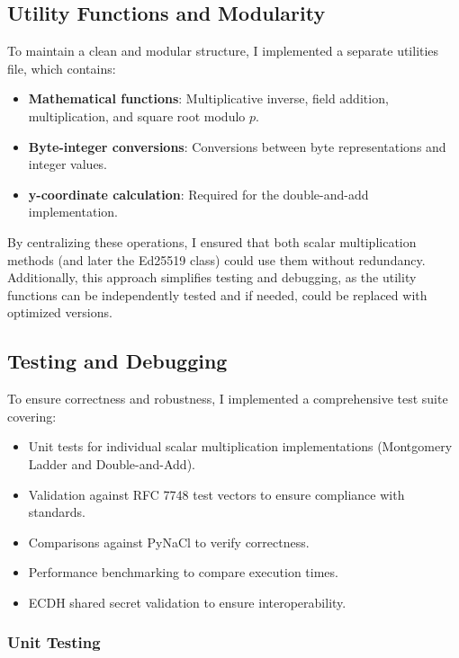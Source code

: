 \documentclass[twoside,a4paper,12pt]{article}
\begin{document}
\subsection{Utility Functions and Modularity}
\label{subsec:x25519_utils}

To maintain a clean and modular structure, I implemented a separate utilities file, which contains:
\begin{itemize}
    \item \textbf{Mathematical functions}: Multiplicative inverse, field addition, multiplication, and square root modulo \( p \).
    \item \textbf{Byte-integer conversions}: Conversions between byte representations and integer values.
    \item \textbf{y-coordinate calculation}: Required for the double-and-add implementation.
\end{itemize}
By centralizing these operations, I ensured that both scalar multiplication methods (and later the Ed25519 class) could use them without redundancy. Additionally, this approach simplifies testing and debugging, as the utility functions can be independently tested and if needed, could be replaced with optimized versions.

\subsection{Testing and Debugging}
\label{subsec:x25519_testing}

To ensure correctness and robustness, I implemented a comprehensive test suite covering:
\begin{itemize}
    \item Unit tests for individual scalar multiplication implementations (Montgomery Ladder and Double-and-Add).
    \item {Validation against RFC 7748 test vectors} to ensure compliance with standards.
    \item {Comparisons against PyNaCl} to verify correctness.
    \item {Performance benchmarking} to compare execution times.
    \item {ECDH shared secret validation} to ensure interoperability.
\end{itemize}

\subsubsection{Unit Testing}
\end{document}
